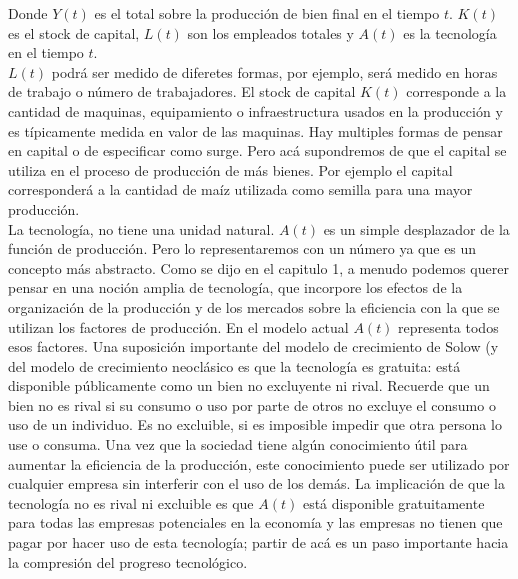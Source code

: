 Donde $Y(t)$ es el total sobre la producción de bien final en el tiempo $t$. $K(t)$ es el stock de capital, $L(t)$ son los empleados totales y $A(t)$ es la tecnología en el tiempo $t$. \\
$L(t)$ podrá ser medido de diferetes formas, por ejemplo, será medido en horas de trabajo o número de trabajadores. El stock de capital $K(t)$ corresponde a la cantidad de maquinas, equipamiento o infraestructura usados en la producción y es típicamente medida en valor de las maquinas. Hay multiples formas de pensar en capital o de especificar como surge. Pero acá supondremos de que el capital se utiliza en el proceso de producción de más bienes. Por ejemplo el capital corresponderá a la cantidad de maíz utilizada como semilla para una mayor producción.\\
La tecnología, no tiene una unidad natural. $A(t)$ es un simple desplazador de la función de producción. Pero lo representaremos con un número ya que es un concepto más abstracto. Como se dijo en el capitulo 1, a menudo podemos querer pensar en una noción amplia de tecnología, que incorpore los efectos de la organización de la producción y de los mercados sobre la eficiencia con la que se utilizan los factores de producción. En el modelo actual $A(t)$ representa todos esos factores. Una suposición importante del modelo de crecimiento de Solow (y del modelo de crecimiento neoclásico es que la tecnología es gratuita: está disponible públicamente como un bien no excluyente ni rival. Recuerde que un bien no es rival si su consumo o uso por parte de otros no excluye el consumo o uso de un individuo. Es no excluible, si es imposible impedir que otra persona lo use o consuma. Una vez que la sociedad tiene algún conocimiento útil para aumentar la eficiencia de la producción, este conocimiento puede ser utilizado por cualquier empresa sin interferir con el uso de los demás. La implicación de que la tecnología no es rival ni excluible es que $A(t)$ está disponible gratuitamente para todas las empresas potenciales en la economía y las empresas no tienen que pagar por hacer uso de esta tecnología; partir de acá es un paso importante hacia la compresión del progreso tecnológico.

